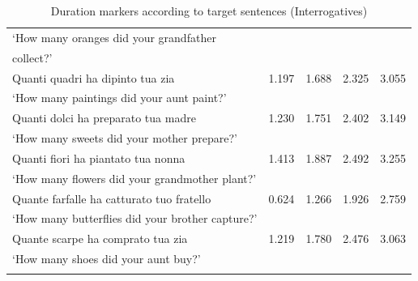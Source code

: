 \documentclass[output=paper]{langsci/langscibook}
\begin{document}
\begin{table}
{\begin{tabular}{lrrrr}
`How many oranges did your grandfather                         &        &                &               &               \\
collect?’                                                      &        &                &               &               \\
Quanti quadri ha dipinto tua zia                               & 1.197  &  1.688         & 2.325         & 3.055         \\
`How many paintings did your aunt paint?’                      &        &                &               &               \\
Quanti dolci ha preparato tua madre                            & 1.230  &  1.751         & 2.402         & 3.149         \\
`How many sweets did your mother prepare?’                     &        &                &               &               \\
Quanti fiori ha piantato tua nonna                             & 1.413  &  1.887         & 2.492         & 3.255         \\
`How many flowers did your grandmother plant?’                 &        &                &               &               \\
Quante farfalle ha catturato tuo fratello                      & 0.624  &  1.266         & 1.926         & 2.759         \\
`How many butterflies did your brother capture?’               &        &                &               &               \\
Quante scarpe ha comprato tua zia                              & 1.219  &  1.780         & 2.476         & 3.063         \\
`How many shoes did your aunt buy?’                            &        &                &               &               \\
\lspbottomrule
\end{tabular}
}
\caption{Duration markers according to target sentences (Interrogatives)}
\label{tab:kel:3}
\end{table}
\end{document}
